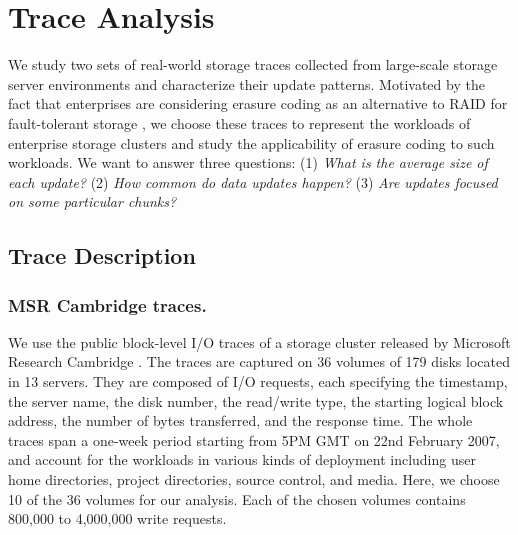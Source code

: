 
\chapter{Trace Analysis} 
\label{sec:trace}

We study two sets of real-world storage traces collected from large-scale
storage server environments and characterize their update patterns.  Motivated
by the fact that enterprises are considering erasure coding as an alternative
to RAID for fault-tolerant storage \cite{raid_alternatives}, we choose these
traces to represent the workloads of enterprise storage clusters and study the
applicability of erasure coding to such workloads.  We want to answer three
questions: (1) \textit{What is the average size of each update?} (2)
\textit{How common do data updates happen?} (3) \textit{Are updates focused on
some particular chunks?}  


\section{Trace Description}

\subsection{MSR Cambridge traces.} We use the public block-level
I/O traces of a storage cluster released by Microsoft Research Cambridge
\cite{narayanan08}. The traces are captured %
on 36 volumes of 179 disks located in 13 servers.  They are composed
of I/O requests, each specifying the timestamp, the server name, the disk
number, the read/write type, the starting logical block address, 
the number of bytes transferred, and the response time.  The whole
traces span a one-week period starting from 5PM GMT on 22nd February 2007, and
account for the workloads in various kinds of deployment including user home
directories, project directories, source control, and media.  Here, we choose
10 of the 36 volumes for our analysis.  Each of the chosen volumes contains
800,000 to 4,000,000 write requests. 

